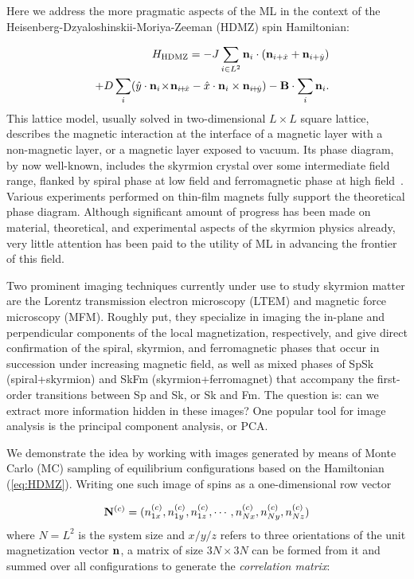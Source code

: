 \documentclass[reprint,amsmath,amssymb,aps,showpacs,superscriptaddress,prl]{revtex4-1}
\newcommand{\ba}{\begin{eqnarray}}
\newcommand{\ea}{\end{eqnarray}}
\renewcommand{\v}[1]{{\bf #1}}
\newcommand{\nn}{\nonumber \\}
\begin{document}
Here we address the more pragmatic aspects of the ML in the context of the
Heisenberg-Dzyaloshinskii-Moriya-Zeeman (HDMZ) spin Hamiltonian:


\ba && H_{\rm HDMZ} = -J \sum_{i\in L^2} \v n_i \cdot (\v n_{i+\hat{x}} + \v n_{i+\hat{y}} ) \nn
 & & + D \sum_i ( \hat{y} \cdot \v n_i \! \times \! \v n_{i\! +\! \hat{x}} - \hat{x} \cdot \v n_i \times \v n_{i\! +\! \hat{y}} )  - \v B \cdot \sum_i \v n_i .  \label{eq:HDMZ} \ea
%
This lattice model, usually solved in two-dimensional $L\times L$ square lattice, describes the magnetic interaction at the interface of a magnetic layer with a non-magnetic layer, or a magnetic layer exposed to vacuum. Its phase diagram, by now well-known, includes the skyrmion crystal over some intermediate field range, flanked by spiral phase at low field and ferromagnetic phase at high field~\cite{nagaosa-review,skyrmion-book,jiang-review,fert-review,han-book}. Various experiments performed on thin-film magnets fully support the theoretical phase diagram. Although significant amount of progress has been made on material, theoretical, and experimental aspects of the skyrmion physics already, very little attention has been paid to the utility of ML in advancing the frontier of this field.

Two prominent imaging techniques currently under use to study skyrmion matter are the Lorentz transmission electron microscopy (LTEM) and magnetic force microscopy (MFM). Roughly put, they specialize in imaging the in-plane and perpendicular components of the local magnetization, respectively, and give direct confirmation of the spiral, skyrmion, and ferromagnetic phases that occur in succession under increasing magnetic field, as well as mixed phases of SpSk (spiral+skyrmion) and SkFm (skyrmion+ferromagnet) that accompany the first-order transitions between Sp and Sk, or Sk and Fm. The question is: can we extract more information hidden in these images?  One popular tool for image analysis is the principal component analysis, or PCA.

We demonstrate the idea by working with images generated by means of Monte Carlo (MC) sampling of equilibrium configurations based on the Hamiltonian (\ref{eq:HDMZ}). Writing one such image of spins as a one-dimensional row vector

\ba \v N^{(c)} = (n_{1x}^{(c)}, n_{1y}^{(c)}, n_{1z}^{(c)}, \cdots, n_{Nx}^{(c)}, n_{Ny}^{(c)}, n_{Nz}^{(c)}) \ea
%
where $N=L^2$ is the system size and $x/y/z$ refers to three orientations of the unit magnetization vector $\v n$, a matrix of size $3N\times 3N$ can be formed from it and summed over all configurations to generate the {\it correlation matrix}:
\end{document}
